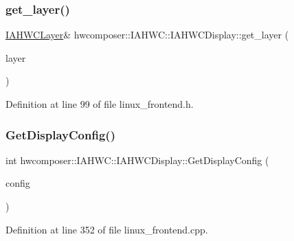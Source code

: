 \subsubsection{\texorpdfstring{get\+\_\+layer()}{get\_layer()}}
{\footnotesize\ttfamily \mbox{\hyperlink{classhwcomposer_1_1IAHWC_1_1IAHWCLayer}{I\+A\+H\+W\+C\+Layer}}\& hwcomposer\+::\+I\+A\+H\+W\+C\+::\+I\+A\+H\+W\+C\+Display\+::get\+\_\+layer (\begin{DoxyParamCaption}\item[{\mbox{\hyperlink{iahwc_8h_a603c5018c43d1f6b98fbb7eeef6a43ac}{iahwc\+\_\+layer\+\_\+t}}}]{layer }\end{DoxyParamCaption})\hspace{0.3cm}{\ttfamily [inline]}}



Definition at line 99 of file linux\+\_\+frontend.\+h.


\begin{DoxyCode}{0}
\end{DoxyCode}
\mbox{\label{classhwcomposer_1_1IAHWC_1_1IAHWCDisplay_a7088d0da276eca2dc2b4458f20270258}} 
\subsubsection{\texorpdfstring{Get\+Display\+Config()}{GetDisplayConfig()}}
{\footnotesize\ttfamily int hwcomposer\+::\+I\+A\+H\+W\+C\+::\+I\+A\+H\+W\+C\+Display\+::\+Get\+Display\+Config (\begin{DoxyParamCaption}\item[{uint32\+\_\+t $\ast$}]{config }\end{DoxyParamCaption})}



Definition at line 352 of file linux\+\_\+frontend.\+cpp.


